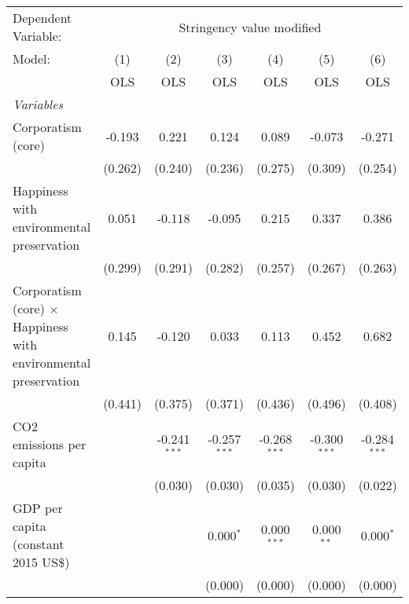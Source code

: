 
\begingroup
\centering
\begin{tabular}{lcccccc}
   \toprule
   Dependent Variable: & \multicolumn{6}{c}{Stringency value modified}\\
   Model:                                                                 & (1)     & (2)            & (3)            & (4)            & (5)            & (6)\\  
                                                                          &  OLS    & OLS            & OLS            & OLS            & OLS            & OLS\\  
   \midrule
   \emph{Variables}\\
   Corporatism (core)                                                     & -0.193  & 0.221          & 0.124          & 0.089          & -0.073         & -0.271\\   
                                                                          & (0.262) & (0.240)        & (0.236)        & (0.275)        & (0.309)        & (0.254)\\   
   Happiness with environmental preservation                              & 0.051   & -0.118         & -0.095         & 0.215          & 0.337          & 0.386\\   
                                                                          & (0.299) & (0.291)        & (0.282)        & (0.257)        & (0.267)        & (0.263)\\   
   Corporatism (core) $\times$ Happiness with environmental preservation  & 0.145   & -0.120         & 0.033          & 0.113          & 0.452          & 0.682\\   
                                                                          & (0.441) & (0.375)        & (0.371)        & (0.436)        & (0.496)        & (0.408)\\   
   CO2 emissions per capita                                               &         & -0.241$^{***}$ & -0.257$^{***}$ & -0.268$^{***}$ & -0.300$^{***}$ & -0.284$^{***}$\\   
                                                                          &         & (0.030)        & (0.030)        & (0.035)        & (0.030)        & (0.022)\\   
   GDP per capita (constant 2015 US\$)                                    &         &                & 0.000$^{*}$    & 0.000$^{***}$  & 0.000$^{**}$   & 0.000$^{*}$\\   
                                                                          &         &                & (0.000)        & (0.000)        & (0.000)        & (0.000)\\   

\end{tabular}

